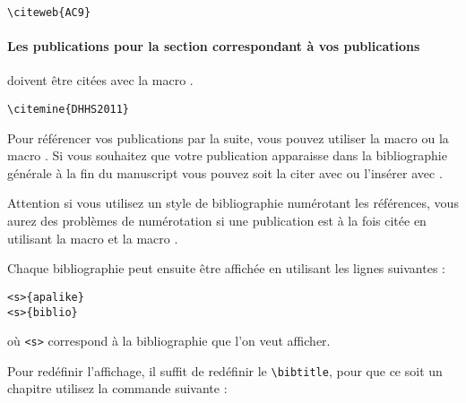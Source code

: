 \begin{framed}
\noindent{} \vspace{-0.75em}
\begin{verbatim}\citeweb{AC9}\end{verbatim}\vspace{-0.75em}
\end{framed}

\paragraph{Les publications pour la section correspondant à vos publications} doivent être citées avec la macro .

\begin{framed}
\noindent{} \vspace{-0.75em}
\begin{verbatim}\citemine{DHHS2011}\end{verbatim}\vspace{-0.75em}
\end{framed}

Pour référencer vos publications par la suite, vous pouvez utiliser la macro  ou la macro .
Si vous souhaitez que votre publication apparaisse dans la bibliographie générale à la fin du manuscript vous pouvez soit la citer avec  ou l'insérer avec . \nocite{DHHS2011} 

Attention si vous utilisez un style de bibliographie numérotant les références, vous aurez des problèmes de numérotation si une publication est à la fois citée en utilisant la macro  et la macro .


Chaque bibliographie peut ensuite être affichée en utilisant les lignes suivantes :

\begin{framed}\vspace{-0.75em}
\begin{verbatim}<s>{apalike}
<s>{biblio}
\end{verbatim}\vspace{-0.75em}
\end{framed}

où \verb|<s>| correspond à la bibliographie que l'on veut afficher.

Pour redéfinir l'affichage, il suffit de redéfinir le \verb|\bibtitle|, pour que ce soit un chapitre utilisez la commande suivante :


